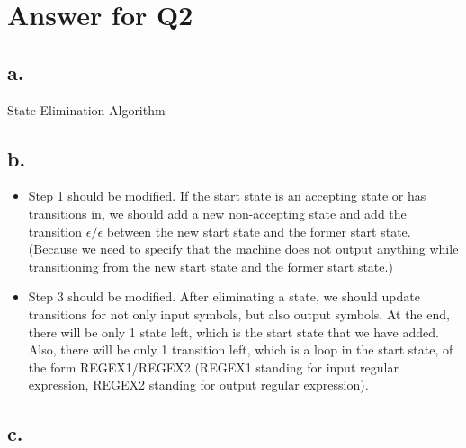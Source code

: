 \documentclass[12pt]{article}
\begin{document}
\section*{Answer for Q2}
\subsection*{a.} 
State Elimination Algorithm
\subsection*{b.} 
\begin{itemize}
\item Step 1 should be modified. If the start state is an accepting state or has transitions in, we should add a new non-accepting state and add the transition $\epsilon/\epsilon$ between the new start state and the former start state. (Because we need to specify that the machine does not output anything while transitioning from the new start state and the former start state.)
\item Step 3 should be modified. After eliminating a state, we should update transitions for not only input symbols, but also output symbols. At the end, there will be only 1 state left, which is the start state that we have added. Also, there will be only 1 transition left, which is a loop in the start state, of the form REGEX1/REGEX2 (REGEX1 standing for input regular expression, REGEX2 standing for output regular expression).
\end{itemize}
\subsection*{c.}\hfill\vspace{0.5cm}\\

\vspace{0.5cm}\\
\end{document}
